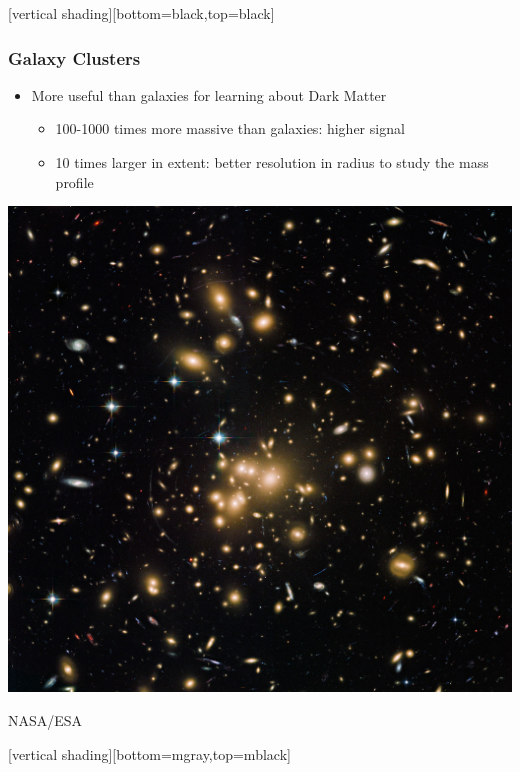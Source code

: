 \documentclass{beamer}
\begin{document}
{
    [vertical shading][bottom=black,top=black]


    \frame
    {
        \frametitle{Galaxy Clusters}

        \begin{itemize}

            \item More useful than galaxies for learning about Dark Matter
            \begin{itemize}

                \item 100-1000 times more massive than galaxies: higher signal

                \item 10 times larger in extent: better resolution in radius to
                    study the mass profile

            \end{itemize}

        \end{itemize}
        \begin{center}
            \includegraphics[trim=0 300 0 500,clip,width=\textwidth]{abell1689_hubble_1280.jpg}
        \end{center}
            \hfill {\tiny NASA/ESA}
    }
    [vertical shading][bottom=mgray,top=mblack]
}
\end{document}
